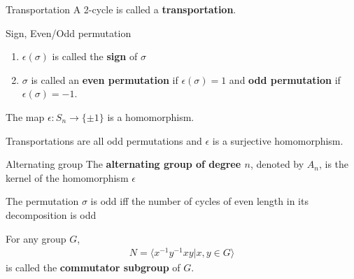 \documentclass[titlepage, 12pt]{article}
\begin{document}
\begin{definition}{Transportation}{}
    A 2-cycle is called a \textbf{transportation}.
\end{definition}
\begin{definition}{Sign, Even/Odd permutation}{}
    \begin{enumerate}
        \item $\epsilon(\sigma)$ is called the \textbf{sign} of $\sigma$
        \item $\sigma$ is called an \textbf{even permutation} if
            $\epsilon(\sigma) = 1$ and \textbf{odd permutation} if
            $\epsilon(\sigma) = -1$.
    \end{enumerate}
\end{definition}
\begin{proposition}{}{}
    The map $\epsilon:S_n\rightarrow\{\pm 1\}$ is a homomorphism.
\end{proposition}
\begin{proposition}{}{}
    Transportations are all odd permutations and $\epsilon$ is a surjective
    homomorphism.
\end{proposition}
\begin{definition}{Alternating group}{}
    The \textbf{alternating group of degree $n$}, denoted by $A_n$, is the
    kernel of the homomorphism $\epsilon$
\end{definition}
\begin{proposition}{}{}
    The permutation $\sigma$ is odd iff the number of cycles of even length in
    its decomposition is odd
\end{proposition}
\begin{definition}{}{}
    For any group $G$,
    \begin{gather*}
        N = \langle x^{-1}y^{-1}xy | x, y\in G\rangle
    \end{gather*}
    is called the \textbf{commutator subgroup} of $G$.
\end{definition}
\end{document}

